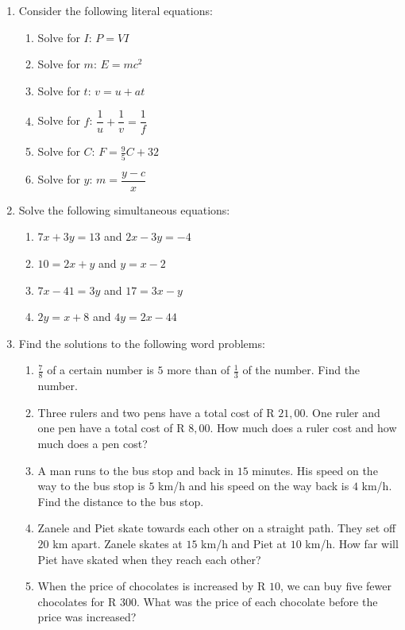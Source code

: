 \begin{eocexercises}{}
\begin{enumerate}[itemsep=5pt, label=\textbf{\arabic*}. ]
\item Consider the following literal equations:
\begin{multicols}{2}
\begin{enumerate}[itemsep=4pt,label=\textbf{(\alph*)}]
\item Solve for $I$: $P = VI$
\item Solve for $m$: $E=mc^{2}$
\item Solve for $t$: $v = u + at$
\item Solve for $f$: $\dfrac{1}{u} + \dfrac{1}{v} = \dfrac{1}{f}$
\item Solve for $C$: $F=\frac{9}{5}C + 32$
\item Solve for $y$: $m = \dfrac{y-c}{x}$
\end{enumerate}
\end{multicols}
\item Solve the following simultaneous equations:
\begin{multicols}{2}
\begin{enumerate}[itemsep=2pt,label=\textbf{(\alph*)}]
\item $7x+3y=13$ and $2x-3y=-4$  
\item $10=2x+y$ and $y=x-2$
\item $7x-41=3y$ and $17=3x-y$
\item $2y=x+8$ and $4y=2x-44$
\end{enumerate}
\end{multicols}
\item Find the solutions to the following word problems:
\begin{enumerate}[itemsep=2pt,label=\textbf{(\alph*)}]
\item $\frac{7}{8}$ of a certain number is $5$ more than of $\frac{1}{3}$ of the number. Find the number.
\item Three rulers and two pens have a total cost of R $21,00$. One ruler and one pen have a total cost of R $8,00$. How much does a ruler cost and how much does a pen cost? 
\item A man runs to the bus stop and back in $15$ minutes. His speed on the way to the bus stop is $5$ km/h and his speed on the way back is $4$ km/h. Find the distance to the bus stop.
\item Zanele and Piet skate towards each other on a straight path. They set off $20$ km apart. Zanele skates at $15$ km/h and Piet at $10$ km/h. How far will Piet have skated when they reach each other?
\item When the price of chocolates is increased by R $10$, we can buy five fewer chocolates for R $300$. What was the price of each chocolate before the price was increased?
\end{enumerate}
\end{enumerate}

\end{eocexercises}


